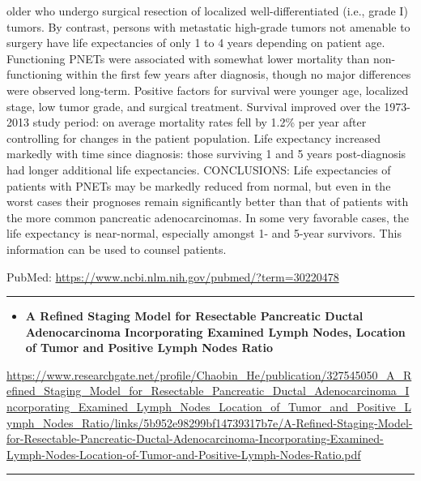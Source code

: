 \documentclass[]{article}
\providecommand{\tightlist}{%
  \setlength{\itemsep}{0pt}\setlength{\parskip}{0pt}}
\begin{document}
older who undergo surgical resection of localized well-differentiated
(i.e., grade I) tumors. By contrast, persons with metastatic high-grade
tumors not amenable to surgery have life expectancies of only 1 to 4
years depending on patient age. Functioning PNETs were associated with
somewhat lower mortality than non-functioning within the first few years
after diagnosis, though no major differences were observed long-term.
Positive factors for survival were younger age, localized stage, low
tumor grade, and surgical treatment. Survival improved over the
1973-2013 study period: on average mortality rates fell by 1.2\% per
year after controlling for changes in the patient population. Life
expectancy increased markedly with time since diagnosis: those surviving
1 and 5 years post-diagnosis had longer additional life expectancies.
CONCLUSIONS: Life expectancies of patients with PNETs may be markedly
reduced from normal, but even in the worst cases their prognoses remain
significantly better than that of patients with the more common
pancreatic adenocarcinomas. In some very favorable cases, the life
expectancy is near-normal, especially amongst 1- and 5-year survivors.
This information can be used to counsel patients.

PubMed: \url{https://www.ncbi.nlm.nih.gov/pubmed/?term=30220478}

{}

{}

\begin{center}\rule{0.5\linewidth}{\linethickness}\end{center}

\begin{itemize}
\tightlist
\item
  \textbf{A Refined Staging Model for Resectable Pancreatic Ductal
  Adenocarcinoma Incorporating Examined Lymph Nodes, Location of Tumor
  and Positive Lymph Nodes Ratio}
\end{itemize}

\url{https://www.researchgate.net/profile/Chaobin_He/publication/327545050_A_Refined_Staging_Model_for_Resectable_Pancreatic_Ductal_Adenocarcinoma_Incorporating_Examined_Lymph_Nodes_Location_of_Tumor_and_Positive_Lymph_Nodes_Ratio/links/5b952e98299bf14739317b7e/A-Refined-Staging-Model-for-Resectable-Pancreatic-Ductal-Adenocarcinoma-Incorporating-Examined-Lymph-Nodes-Location-of-Tumor-and-Positive-Lymph-Nodes-Ratio.pdf}

\begin{center}\rule{0.5\linewidth}{\linethickness}\end{center}
\end{document}
